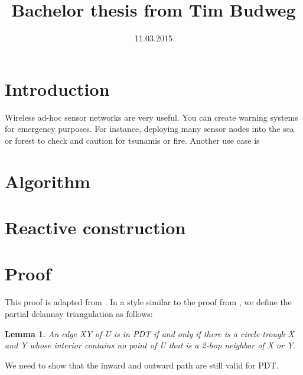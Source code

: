 \documentclass[a4paper,twoside, onecolumn]{IEEEtran}
\title{Bachelor thesis from Tim Budweg}
\author{}
\date{11.03.2015}
\newtheorem{emptycircle}{Lemma}[section]
\begin{document}
\maketitle

\section{Introduction}
Wireless ad-hoc sensor networks are very useful. 
You can create warning systems for emergency purposes.
For instance, deploying many sensor nodes into the sea or forest to check and caution for tsunamis or fire.
Another use case is
\section{Algorithm}
\section{Reactive construction}
\section{Proof}
This proof is adapted from \cite{kanj}.
In a style similar to the proof from \cite{kanj}, we define the partial delaunay triangulation as follows:
\begin{emptycircle}
An edge XY of U is in PDT if and only if there is a circle trough X and Y whose interior contains no point of U that is a 2-hop neighbor of X or Y.
\end{emptycircle}
We need to show that the inward and outward path are still valid for PDT.




\end{document}
